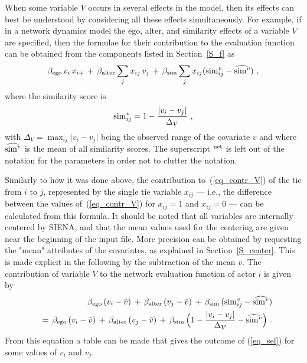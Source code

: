 \documentclass[a4paper,fleqn,11pt]{article}
\newcommand{\+}{\, + \,}
\newcommand{\si}{{\sf SIENA}}
\begin{document}
When some variable $V$ occurs in several effects in the model,
then its effects can best be understood
by considering all these effects simultaneously.
For example, if in a network dynamics model the
ego, alter, and similarity effects of a variable $V$ are specified,
then the formulae for their contribution
to the evaluation function can be obtained
from the components listed in Section~\ref{S_f} as
\begin{equation}
 \beta_{\rm ego}\, v_i \, x_{i+}
           \, + \, \beta_{\rm alter}  \sum_j x_{ij}\, v_j \, + \,
        \beta_{\rm sim}  \sum_j x_{ij}
                          ({\rm sim}^v_{ij} - \widehat{{\rm sim}^v}) \ ,
        \label{eq_contr_V}
\end{equation}
where the similarity score is
\[
{\rm sim}^v_{ij}= 1 - \frac{\vert v_i - v_j \vert}{\Delta_V} \ ,
\]
with
$\Delta_V=\max_{ij}\vert v_i - v_j \vert$ being
the observed range of the covariate $v$
and where $\widehat{{\rm sim}^v}$ is the mean of all similarity scores.
The superscript $^{\rm net}$ is left out of the notation for the parameters
in order not to clutter the notation.

Similarly to how it was done above, the contribution to~(\ref{eq_contr_V})
of the tie from $i$ to $j$, represented by the
single tie variable $x_{ij}$ --- i.e., the difference
between the values of~(\ref{eq_contr_V}) for $x_{ij}=1$
and $x_{ij}=0$  ---  can be calculated from this formula.
It should be noted that all variables are internally centered by \si,
and that the mean values used for the centering
are given near the beginning of the input file.
More precision can be obtained by requesting the \textsf{"mean"}
attributes of the covariates, as explained in
Section~\ref{S_center}.
This is made explicit in the following by the subtraction
of the mean $\bar v$. The contribution of variable $V$ to the
network evaluation function of actor $i$ is given by
\begin{eqnarray}
  & & \beta_{\rm ego}\, (v_i - \bar v)
                \, + \, \beta_{\rm alter}\,  (v_j - \bar v) \, + \,
   \beta_{\rm sim} \, ({\rm sim}^v_{ij} - \widehat{{\rm sim}^v} ) \nonumber \\
 && = \, \beta_{\rm ego}\, (v_i - \bar v)
              \, + \, \beta_{\rm alter}\,  (v_j - \bar v) \, + \,
        \beta_{\rm sim} \,  \Big( 1 - \frac{\vert v_i - v_j \vert}{\Delta_V}
                     - \widehat{{\rm sim}^v} \Big) \ .
                 \label{eq_sel}
\end{eqnarray}
From this equation a table can be made that gives the
outcome of (\ref{eq_sel}) for some values of $v_i$ and $v_j$.
\end{document}

